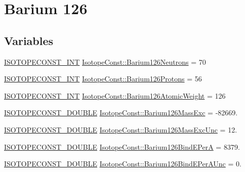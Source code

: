 \hypertarget{group___isotope_const-_barium-_ba126}{}\section{Barium 126}
\label{group___isotope_const-_barium-_ba126}
\subsection*{Variables}
\begin{DoxyCompactItemize}
\item 
\mbox{\hyperlink{group___isotope_const-_macros_ga5f18360b3e99483a35c32d789e62621c}{I\+S\+O\+T\+O\+P\+E\+C\+O\+N\+S\+T\+\_\+\+I\+NT}} \mbox{\hyperlink{group___isotope_const-_barium-_ba126_gaa25e725574a092a6af2c9d2cbfbe8078}{Isotope\+Const\+::\+Barium126\+Neutrons}} = 70
\item 
\mbox{\hyperlink{group___isotope_const-_macros_ga5f18360b3e99483a35c32d789e62621c}{I\+S\+O\+T\+O\+P\+E\+C\+O\+N\+S\+T\+\_\+\+I\+NT}} \mbox{\hyperlink{group___isotope_const-_barium-_ba126_ga851d62be20d251ac9102db4a70505724}{Isotope\+Const\+::\+Barium126\+Protons}} = 56
\item 
\mbox{\hyperlink{group___isotope_const-_macros_ga5f18360b3e99483a35c32d789e62621c}{I\+S\+O\+T\+O\+P\+E\+C\+O\+N\+S\+T\+\_\+\+I\+NT}} \mbox{\hyperlink{group___isotope_const-_barium-_ba126_gac938dacc16fb3333f3461d2f5d1b0ce1}{Isotope\+Const\+::\+Barium126\+Atomic\+Weight}} = 126
\item 
\mbox{\hyperlink{group___isotope_const-_macros_ga8f45a7272ce02c0b4c65c44636ed719a}{I\+S\+O\+T\+O\+P\+E\+C\+O\+N\+S\+T\+\_\+\+D\+O\+U\+B\+LE}} \mbox{\hyperlink{group___isotope_const-_barium-_ba126_ga60999e12f8a652e538e7a0ded5f71b46}{Isotope\+Const\+::\+Barium126\+Mass\+Exc}} = -\/82669.
\item 
\mbox{\hyperlink{group___isotope_const-_macros_ga8f45a7272ce02c0b4c65c44636ed719a}{I\+S\+O\+T\+O\+P\+E\+C\+O\+N\+S\+T\+\_\+\+D\+O\+U\+B\+LE}} \mbox{\hyperlink{group___isotope_const-_barium-_ba126_ga59a4520327094da8e955099847dd3ff0}{Isotope\+Const\+::\+Barium126\+Mass\+Exc\+Unc}} = 12.
\item 
\mbox{\hyperlink{group___isotope_const-_macros_ga8f45a7272ce02c0b4c65c44636ed719a}{I\+S\+O\+T\+O\+P\+E\+C\+O\+N\+S\+T\+\_\+\+D\+O\+U\+B\+LE}} \mbox{\hyperlink{group___isotope_const-_barium-_ba126_gab44ae9cb8f4c5d191989a2b7f913e345}{Isotope\+Const\+::\+Barium126\+Bind\+E\+PerA}} = 8379.
\item 
\mbox{\hyperlink{group___isotope_const-_macros_ga8f45a7272ce02c0b4c65c44636ed719a}{I\+S\+O\+T\+O\+P\+E\+C\+O\+N\+S\+T\+\_\+\+D\+O\+U\+B\+LE}} \mbox{\hyperlink{group___isotope_const-_barium-_ba126_ga9cd4b0db64a5acc91539ae6b369e2ab5}{Isotope\+Const\+::\+Barium126\+Bind\+E\+Per\+A\+Unc}} = 0.

\end{DoxyCompactItemize}

